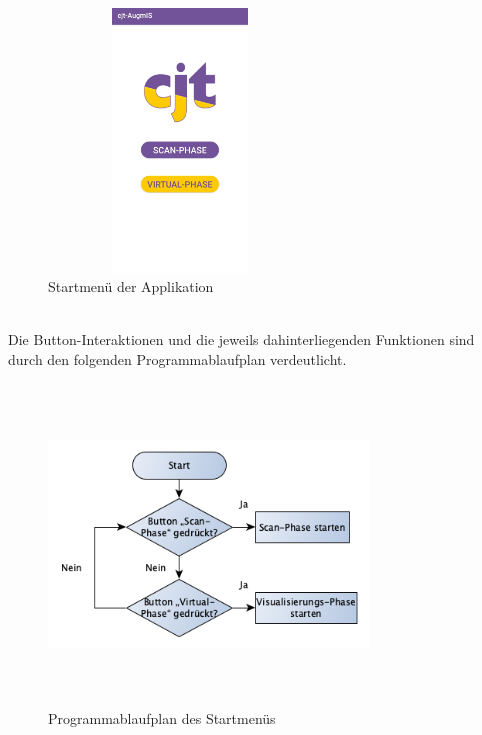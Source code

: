 \begin{figure}[hbt!]
    \centering
    \includegraphics[width=7cm,height=7cm,keepaspectratio]{4Umsetzung/Bilder/startmenu.jpg}
    \caption{Startmenü der Applikation}
    \label{pic:startmenu}
\end{figure}
\\
Die Button-Interaktionen und die jeweils dahinterliegenden Funktionen sind durch den folgenden Programmablaufplan verdeutlicht. 
\begin{figure}[hbt!]
    \centering
    \includegraphics[width=8.5cm,height=8.5cm,keepaspectratio]{4Umsetzung/Bilder/startPAP.png}
    \caption{Programmablaufplan des Startmenüs}
    \label{pic:startmenu}
\end{figure}
\pagebreak
